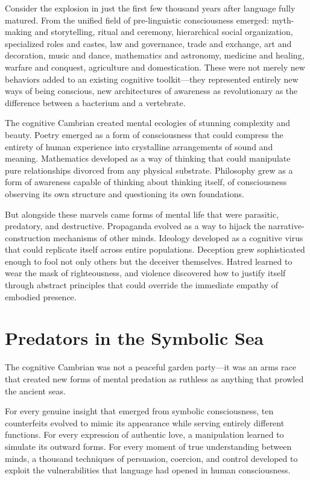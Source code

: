 Consider the explosion in just the first few thousand years after language fully matured. From the unified field of pre-linguistic consciousness emerged: myth-making and storytelling, ritual and ceremony, hierarchical social organization, specialized roles and castes, law and governance, trade and exchange, art and decoration, music and dance, mathematics and astronomy, medicine and healing, warfare and conquest, agriculture and domestication. These were not merely new behaviors added to an existing cognitive toolkit—they represented entirely new ways of being conscious, new architectures of awareness as revolutionary as the difference between a bacterium and a vertebrate.

The cognitive Cambrian created mental ecologies of stunning complexity and beauty. Poetry emerged as a form of consciousness that could compress the entirety of human experience into crystalline arrangements of sound and meaning. Mathematics developed as a way of thinking that could manipulate pure relationships divorced from any physical substrate. Philosophy grew as a form of awareness capable of thinking about thinking itself, of consciousness observing its own structure and questioning its own foundations.

But alongside these marvels came forms of mental life that were parasitic, predatory, and destructive. Propaganda evolved as a way to hijack the narrative-construction mechanisms of other minds. Ideology developed as a cognitive virus that could replicate itself across entire populations. Deception grew sophisticated enough to fool not only others but the deceiver themselves. Hatred learned to wear the mask of righteousness, and violence discovered how to justify itself through abstract principles that could override the immediate empathy of embodied presence.

\section{Predators in the Symbolic Sea}

The cognitive Cambrian was not a peaceful garden party—it was an arms race that created new forms of mental predation as ruthless as anything that prowled the ancient seas.

For every genuine insight that emerged from symbolic consciousness, ten counterfeits evolved to mimic its appearance while serving entirely different functions. For every expression of authentic love, a manipulation learned to simulate its outward forms. For every moment of true understanding between minds, a thousand techniques of persuasion, coercion, and control developed to exploit the vulnerabilities that language had opened in human consciousness.

